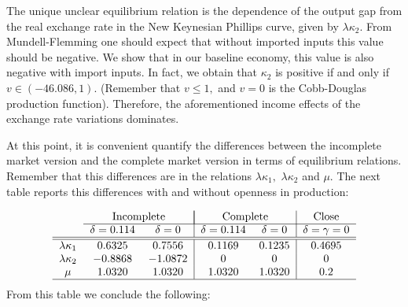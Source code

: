 \documentclass{article}
\begin{document}
The unique unclear equilibrium relation is the dependence of the output gap
from the real exchange rate in the New Keynesian Phillips curve, given by $%
\lambda \kappa _{2}.$ From Mundell-Flemming one should expect that without
imported inputs this value should be negative. We show that in our baseline
economy, this value is also negative with import inputs. In fact, we obtain
that $\kappa _{2}$ is positive if and only if $v\in \left( -46.086,1\right)
. $ (Remember that $v\leq 1,$ and $v=0$ is the Cobb-Douglas production
function). Therefore, the aforementioned income effects of the exchange rate
variations dominates.

At this point, it is convenient quantify the differences between the
incomplete market version and the complete market version in terms of
equilibrium relations. Remember that this differences are in the relations $%
\lambda \kappa _{1},$ $\lambda \kappa _{2}$ and $\mu .$ The next table
reports this differences with and without openness in production:

\begin{equation*}
\begin{tabular}{ccc|cc|c}
& \multicolumn{2}{c|}{Incomplete} & \multicolumn{2}{|c|}{Complete} & Close
\\ \cline{2-6}
& $\delta =0.114$ & $\delta =0$ & $\delta =0.114$ & $\delta =0$ & $\delta
=\gamma =0$ \\ \hline\hline
$\lambda \kappa _{1}$ & $0.6325$ & $0.7556$ & $0.1169$ & $0.1235$ & $0.4695$
\\ 
$\lambda \kappa _{2}$ & $-0.8868$ & $-1.0872$ & $0$ & $0$ & $0$ \\ 
$\mu $ & $1.0320$ & $1.0320$ & $1.0320$ & $1.0320$ & $0.2$ \\ \hline
\end{tabular}%
\end{equation*}%
From this table we conclude the following:
\end{document}
